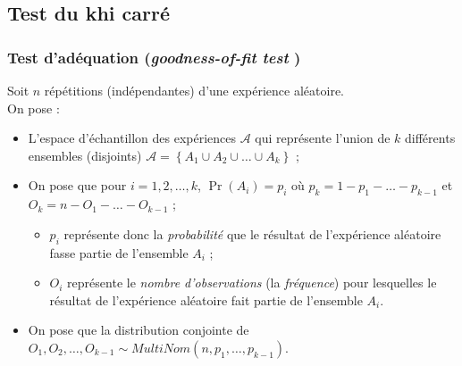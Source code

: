 \documentclass[10pt, french]{article}
\begin{document}
\begin{multicols*}{2}


\columnbreak
\subsection{Test du khi carré}
\subsubsection{Test d'adéquation (\og \textit{goodness-of-fit test} \fg{})}
Soit $n$ répétitions (indépendantes) d'une expérience aléatoire.\\
On pose :
\begin{itemize}
	\item	L'espace d'échantillon des expériences $\mathcal{A}$ qui représente l'union de $k$ différents ensembles (disjoints) $\mathcal{A}	=	\left\{A_{1} \cup A_{2} \cup \dots \cup A_{k} \right\}$ ;
	\item	On pose que pour $i	=	1, 2, \dots, k$, $\Pr(A_{i})	=	p_{i}$ où $p_{k}	=	1	-	p_{1}	-	\hdots	-	p_{k - 1}$ et $O_{k}	=	n	-	O_{1}	-	\hdots	-	O_{k - 1}$ ;
		\begin{itemize}
		\item	$p_{i}$ représente donc la \textit{probabilité} que le résultat de l'expérience aléatoire fasse partie de l'ensemble $A_{i}$ ;
		\item	$O_{i}$	représente le \textit{nombre d'observations} (la \textit{fréquence}) pour lesquelles le résultat de l'expérience aléatoire fait partie de l'ensemble $A_{i}$.
		\end{itemize}
	\item	On pose que la distribution conjointe de $O_{1}, O_{2}, \dots, O_{k - 1} \sim MultiNom(n, p_{1}, \dots, p_{k - 1})$.
\end{itemize}


\end{multicols*}
\end{document}
